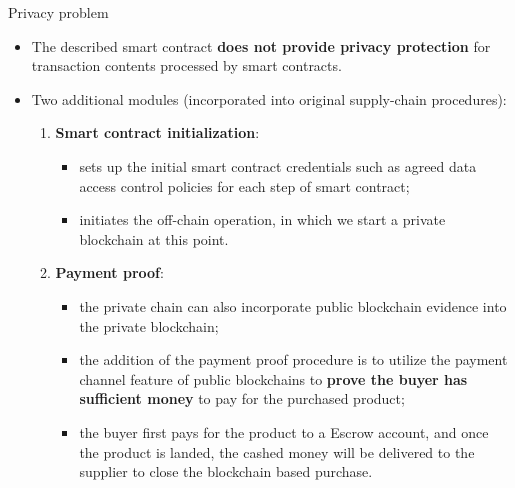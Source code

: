 \documentclass[11pt]{beamer}
\begin{document}
\begin{frame}[allowframebreaks]{Privacy problem}
\begin{itemize}
\item The described smart contract \textbf{does not provide privacy protection} for transaction contents processed by smart contracts.
\item Two additional modules (incorporated into original supply-chain procedures):
\begin{enumerate}
	\item \textbf{Smart contract initialization}: 
	\begin{itemize}
		\item sets up the initial smart contract credentials such as agreed data access control policies for each step of smart contract;
		\item initiates the off-chain operation, in which we start a private blockchain at this point.
	\end{itemize}
	\item \textbf{Payment proof}:
	\begin{itemize}
		\item the private chain can also incorporate public blockchain evidence into the private blockchain;
		\item the addition of the payment proof procedure is to utilize the payment channel feature of public blockchains to \textbf{prove the buyer has sufficient money} to pay for the purchased product;
		\item  the buyer first pays for the product to a Escrow account, and once the product is landed, the cashed money will be delivered to the supplier to close the blockchain based purchase.
	\end{itemize}
\end{enumerate}
\end{itemize}
\end{frame}
\end{document}
